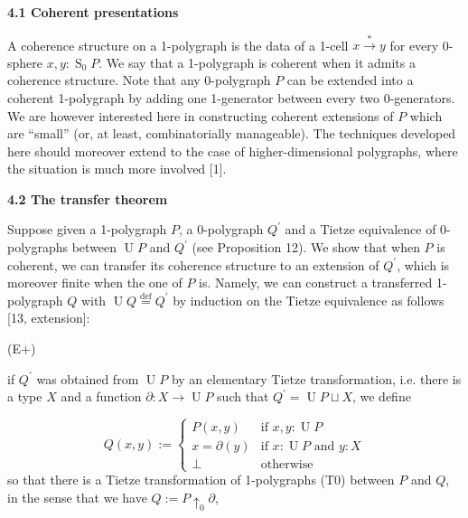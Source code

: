  
 
\par\medskip\noindent\textbf{4.1 Coherent presentations}\par
 
 
A coherence structure on a 1-polygraph is the data of a 1-cell $x\overset{*}{\to}y$ for every 0-sphere $x,y:\operatorname{S}_{0}P$. We say that a 1-polygraph is coherent when it admits a coherence structure. Note that any 0-polygraph $P$ can be extended into a coherent 1-polygraph by adding one 1-generator between every two 0-generators. We are however interested here in constructing coherent extensions of $P$ which are “small” (or, at least, combinatorially manageable). The techniques developed here should moreover extend to the case of higher-dimensional polygraphs, where the situation is much more involved [1].\par
 
 
 
 
\par\medskip\noindent\textbf{4.2 The transfer theorem}\par
 
 
Suppose given a 1-polygraph $P$, a 0-polygraph $Q^{\prime}$ and a Tietze equivalence of 0-polygraphs between $\operatorname{U}P$ and $Q^{\prime}$ (see Proposition 12). We show that when $P$ is coherent, we can transfer its coherence structure to an extension of $Q^{\prime}$, which is moreover finite when the one of $P$ is. Namely, we can construct a transferred 1-polygraph $Q$ with $\operatorname{U}Q\overset{\text{def}}{=}Q^{\prime}$ by induction on the Tietze equivalence as follows [13, extension]:\par
  (E$+$)  
 
if $Q^{\prime}$ was obtained from $\operatorname{U}P$ by an elementary Tietze transformation, i.e. there is a type $X$ and a function $\partial:X\to\operatorname{U}P$ such that $Q^{\prime}=\operatorname{U}P\sqcup X$, we define\par
    \[Q(x,y):=\begin{cases}P(x,y)&\text{if $x,y:\operatorname{U}P$}\\
x=\partial(y)&\text{if $x:\operatorname{U}P$ and $y:X$}\\
\bot&\text{otherwise}\end{cases}\]    
so that there is a Tietze transformation of 1-polygraphs (T0) between $P$ and $Q$, in the sense that we have $Q:=P{\uparrow_{0}}\partial$,\par
 
